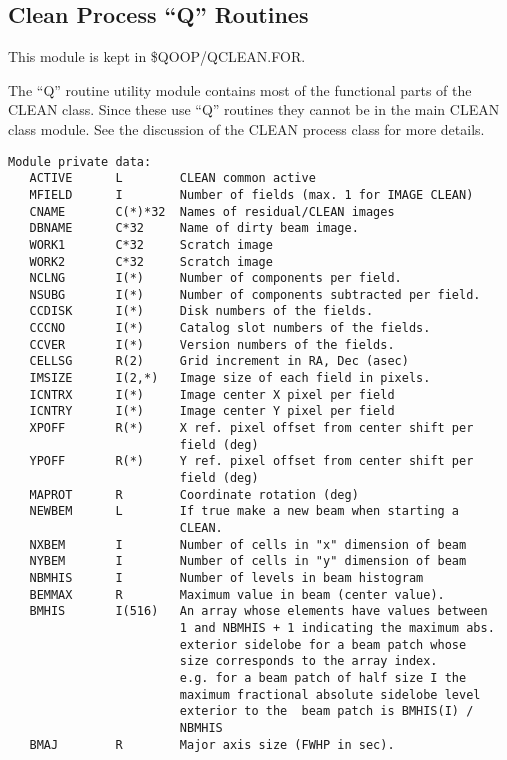 \subsection{Clean Process ``Q'' Routines}

   This module is kept in \$QOOP/QCLEAN.FOR.

 The ``Q'' routine utility module contains most of the functional
 parts of the CLEAN class.  Since these use ``Q'' routines they cannot
 be in the main CLEAN class module.  See the discussion of the CLEAN
process class for more details.

{\small\begin{verbatim}
Module private data:
   ACTIVE      L        CLEAN common active
   MFIELD      I        Number of fields (max. 1 for IMAGE CLEAN)
   CNAME       C(*)*32  Names of residual/CLEAN images
   DBNAME      C*32     Name of dirty beam image.
   WORK1       C*32     Scratch image
   WORK2       C*32     Scratch image
   NCLNG       I(*)     Number of components per field.
   NSUBG       I(*)     Number of components subtracted per field.
   CCDISK      I(*)     Disk numbers of the fields.
   CCCNO       I(*)     Catalog slot numbers of the fields.
   CCVER       I(*)     Version numbers of the fields.
   CELLSG      R(2)     Grid increment in RA, Dec (asec)
   IMSIZE      I(2,*)   Image size of each field in pixels.
   ICNTRX      I(*)     Image center X pixel per field
   ICNTRY      I(*)     Image center Y pixel per field
   XPOFF       R(*)     X ref. pixel offset from center shift per
                        field (deg)
   YPOFF       R(*)     Y ref. pixel offset from center shift per
                        field (deg)
   MAPROT      R        Coordinate rotation (deg)
   NEWBEM      L        If true make a new beam when starting a
                        CLEAN.
   NXBEM       I        Number of cells in "x" dimension of beam
   NYBEM       I        Number of cells in "y" dimension of beam
   NBMHIS      I        Number of levels in beam histogram
   BEMMAX      R        Maximum value in beam (center value).
   BMHIS       I(516)   An array whose elements have values between
                        1 and NBMHIS + 1 indicating the maximum abs.
                        exterior sidelobe for a beam patch whose
                        size corresponds to the array index.
                        e.g. for a beam patch of half size I the
                        maximum fractional absolute sidelobe level
                        exterior to the  beam patch is BMHIS(I) /
                        NBMHIS
   BMAJ        R        Major axis size (FWHP in sec).

\end{verbatim}}
